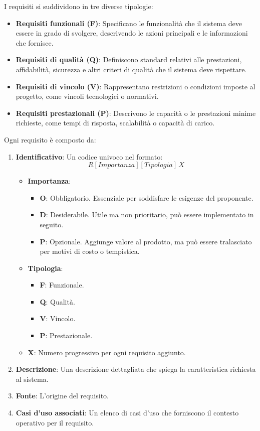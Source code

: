\medskip I requisiti si suddividono in tre diverse tipologie:
\begin{itemize}
    \item \textbf{Requisiti funzionali (F)}: Specificano le funzionalità che il sistema deve essere in grado di svolgere, descrivendo le azioni principali e le informazioni che fornisce.
    \item \textbf{Requisiti di qualità (Q)}: Definiscono standard relativi alle prestazioni, affidabilità, sicurezza e altri criteri di qualità che il sistema deve rispettare.
    \item \textbf{Requisiti di vincolo (V)}: Rappresentano restrizioni o condizioni imposte al progetto, come vincoli tecnologici o normativi.
    \item \textbf{Requisiti prestazionali (P)}: Descrivono le capacità o le prestazioni minime richieste, come tempi di risposta, scalabilità o capacità di carico.
\end{itemize}

Ogni requisito è composto da:
\begin{enumerate}
    \item \textbf{Identificativo}: Un codice univoco nel formato:
    \[
    R[{Importanza}][{Tipologia}] \, X
    \]
    \begin{itemize}
        \item \textbf{Importanza}:
        \begin{itemize}
            \item \textbf{O}: Obbligatorio. Essenziale per soddisfare le esigenze del proponente.
            \item \textbf{D}: Desiderabile. Utile ma non prioritario, può essere implementato in seguito.
            \item \textbf{P}: Opzionale. Aggiunge valore al prodotto, ma può essere tralasciato per motivi di costo o tempistica.
        \end{itemize}
        \item \textbf{Tipologia}:
        \begin{itemize}
            \item \textbf{F}: Funzionale.
            \item \textbf{Q}: Qualità.
            \item \textbf{V}: Vincolo.
            \item \textbf{P}: Prestazionale.
        \end{itemize}
        \item \textbf{X}: Numero progressivo per ogni requisito aggiunto.
    \end{itemize}
    \item \textbf{Descrizione}: Una descrizione dettagliata che spiega la caratteristica richiesta al sistema.
    \item \textbf{Fonte}: L'origine del requisito.
    \item \textbf{Casi d’uso associati}: Un elenco di casi d'uso che forniscono il contesto operativo per il requisito.
\end{enumerate}

